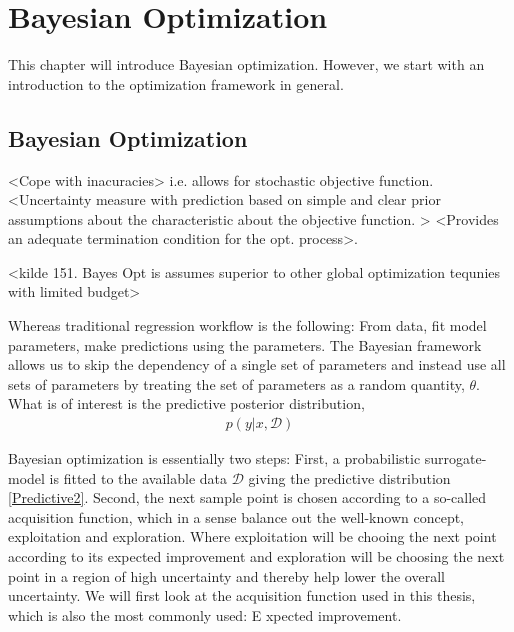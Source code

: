 \chapter{Bayesian Optimization}
This chapter will introduce Bayesian optimization. However, we start with an introduction to the optimization
framework in general. 




\section{Bayesian Optimization}
<Cope with inacuracies> i.e. allows for stochastic objective function. 
<Uncertainty measure with prediction based on simple and clear prior 
assumptions about the characteristic about the objective function. >
<Provides an adequate termination condition for the opt. process>. 

<kilde 151. Bayes Opt is assumes superior to other global optimization tequnies 
with limited budget>


Whereas traditional regression workflow is the following: From data, fit model parameters, make predictions using the parameters. 
The Bayesian framework allows us to skip the dependency of a single set of parameters and instead use all sets of parameters 
by treating the set of parameters as a random quantity, $\theta$. What is of interest is the predictive posterior distribution,  
\begin{align}\label{Predictive2}
    p(y|x, \mathcal{D})
\end{align}

Bayesian optimization is essentially two steps: First, a probabilistic surrogate-model is fitted
to the available data $\mathcal{D}$ giving the predictive distribution \eqref{Predictive2}. Second,
the next sample point is chosen according to a so-called acquisition function, which in a sense
balance out the well-known concept, exploitation and exploration. Where exploitation will be chooing
the next point according to its expected improvement and exploration will be choosing the next point
in a region of high uncertainty and thereby help lower the overall uncertainty. We will first look at
the acquisition function used in this thesis, which is also the most commonly used: E   xpected improvement. 

